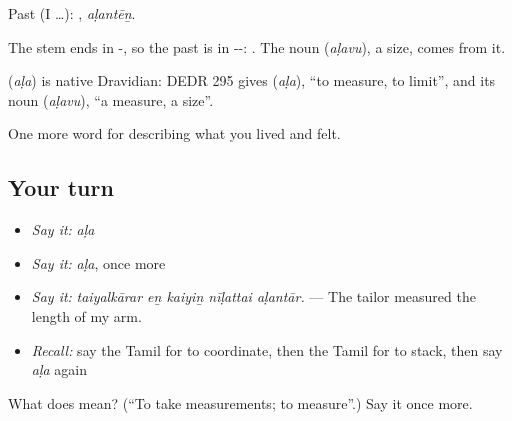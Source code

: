 Past (I …): , \emph{aḷantēṉ}.

The stem ends in -, so the past is in --: . The noun  (\emph{aḷavu}), a size, comes from it.

\begin{cousinweb}
\textbf{} (\emph{aḷa}) is native Dravidian: DEDR 295 gives  (\emph{aḷa}), \textquotedblleft{}to measure, to limit\textquotedblright{}, and its noun  (\emph{aḷavu}), \textquotedblleft{}a measure, a size\textquotedblright{}.
\end{cousinweb}

\begin{grammarlens}[title={What you've built}]
One more word for describing what you lived and felt.
\end{grammarlens}

\subsection*{Your turn}
\begin{itemize}
\raggedright
  \item \emph{Say it:} \emph{aḷa}
  \item \emph{Say it:} \emph{aḷa}, once more
  \item \emph{Say it:} \emph{taiyalkārar eṉ kaiyiṉ nīḷattai aḷantār.} — The tailor measured the length of my arm.
  \item \emph{Recall:} say the Tamil for to coordinate, then the Tamil for to stack, then say \emph{aḷa} again
\end{itemize}

\begin{tcolorbox}[breakable,colback=teal!4,colframe=teal!35!black,title={Before you move on}]
What does  mean? (\textquotedblleft{}To take measurements; to measure\textquotedblright{}.) Say it once more.
\end{tcolorbox}
